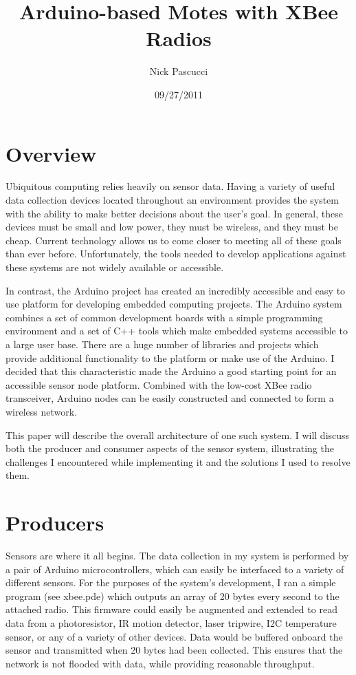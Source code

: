 \documentclass[a4paper,10pt]{article}
\title{Arduino-based Motes with XBee Radios}
\author{Nick Pascucci}
\date{09/27/2011}
\begin{document}
\maketitle

\section{Overview}
Ubiquitous computing relies heavily on sensor data. Having a variety of useful
data collection devices located throughout an environment provides the system
with the ability to make better decisions about the user's goal. In general, these
devices must be small and low power, they must be wireless, and they must be
cheap. Current technology allows us to come closer to meeting all of these goals
than ever before. Unfortunately, the tools needed to develop applications
against these systems are not widely available or accessible.

In contrast, the Arduino project has created an incredibly accessible and easy
to use platform for developing embedded computing projects. The Arduino system
combines a set of common development boards with a simple programming
environment and a set of C++ tools which make embedded systems accessible to a
large user base. There are a huge number of libraries and projects which provide
additional functionality to the platform or make use of the Arduino. I decided
that this characteristic made the Arduino a good starting point for an
accessible sensor node platform. Combined with the low-cost XBee radio
transceiver, Arduino nodes can be easily constructed and connected to form a
wireless network.

This paper will describe the overall architecture of one such system. I will discuss
both the producer and consumer aspects of the sensor system, illustrating the
challenges I encountered while implementing it and the solutions I used to
resolve them.

\section{Producers}
Sensors are where it all begins. The data collection in my system is performed
by a pair of Arduino microcontrollers, which can easily be interfaced to a
variety of different sensors. For the purposes of the system's development, I
ran a simple program (see xbee.pde) which outputs an array of 20 bytes every
second to the attached radio. This firmware could easily be augmented and
extended to read data from a photoresistor, IR motion detector, laser tripwire,
I2C temperature sensor, or any of a variety of other devices. Data would be
buffered onboard the sensor and transmitted when 20 bytes had been
collected. This ensures that the network is not flooded with data, while
providing reasonable throughput.
\end{document}
